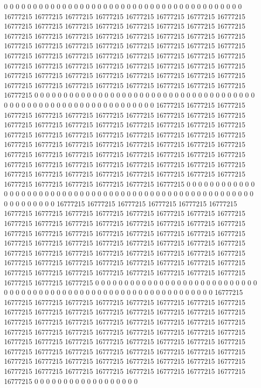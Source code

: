 0 0 0 0 0 0 0 0 0 0 0 0 0 0 0 0 0 0 0 0 0 0 0 0 0 0 0 0 0 0 0 0 0 0 0 0 0 0 0 0 0 16777215 16777215 16777215 16777215 16777215 16777215 16777215 16777215 16777215 16777215 16777215 16777215 16777215 16777215 16777215 16777215 16777215 16777215 16777215 16777215 16777215 16777215 16777215 16777215 16777215 16777215 16777215 16777215 16777215 16777215 16777215 16777215 16777215 16777215 16777215 16777215 16777215 16777215 16777215 16777215 16777215 16777215 16777215 16777215 16777215 16777215 16777215 16777215 16777215 16777215 16777215 16777215 16777215 16777215 16777215 16777215 16777215 16777215 16777215 16777215 16777215 16777215 16777215 16777215 16777215 0 0 0 0 0 0 0 0 0 0 0 0 0 0 0 0 0 0 0 0 0 0
0 0 0 0 0 0 0 0 0 0 0 0 0 0 0 0 0 0 0 0 0 0 0 0 0 0 0 0 0 0 0 0 0 0 0 0 0 0 0 0 0 0 16777215 16777215 16777215 16777215 16777215 16777215 16777215 16777215 16777215 16777215 16777215 16777215 16777215 16777215 16777215 16777215 16777215 16777215 16777215 16777215 16777215 16777215 16777215 16777215 16777215 16777215 16777215 16777215 16777215 16777215 16777215 16777215 16777215 16777215 16777215 16777215 16777215 16777215 16777215 16777215 16777215 16777215 16777215 16777215 16777215 16777215 16777215 16777215 16777215 16777215 16777215 16777215 16777215 16777215 16777215 16777215 16777215 16777215 16777215 16777215 16777215 16777215 16777215 16777215 16777215 0 0 0 0 0 0 0 0 0 0 0 0 0 0 0 0 0 0 0 0 0
0 0 0 0 0 0 0 0 0 0 0 0 0 0 0 0 0 0 0 0 0 0 0 0 0 0 0 0 0 0 0 0 0 0 0 0 0 0 0 0 0 0 0 16777215 16777215 16777215 16777215 16777215 16777215 16777215 16777215 16777215 16777215 16777215 16777215 16777215 16777215 16777215 16777215 16777215 16777215 16777215 16777215 16777215 16777215 16777215 16777215 16777215 16777215 16777215 16777215 16777215 16777215 16777215 16777215 16777215 16777215 16777215 16777215 16777215 16777215 16777215 16777215 16777215 16777215 16777215 16777215 16777215 16777215 16777215 16777215 16777215 16777215 16777215 16777215 16777215 16777215 16777215 16777215 16777215 16777215 16777215 16777215 16777215 16777215 16777215 16777215 16777215 0 0 0 0 0 0 0 0 0 0 0 0 0 0 0 0 0 0 0 0
0 0 0 0 0 0 0 0 0 0 0 0 0 0 0 0 0 0 0 0 0 0 0 0 0 0 0 0 0 0 0 0 0 0 0 0 0 0 0 0 0 0 0 0 16777215 16777215 16777215 16777215 16777215 16777215 16777215 16777215 16777215 16777215 16777215 16777215 16777215 16777215 16777215 16777215 16777215 16777215 16777215 16777215 16777215 16777215 16777215 16777215 16777215 16777215 16777215 16777215 16777215 16777215 16777215 16777215 16777215 16777215 16777215 16777215 16777215 16777215 16777215 16777215 16777215 16777215 16777215 16777215 16777215 16777215 16777215 16777215 16777215 16777215 16777215 16777215 16777215 16777215 16777215 16777215 16777215 16777215 16777215 16777215 16777215 16777215 16777215 16777215 16777215 16777215 0 0 0 0 0 0 0 0 0 0 0 0 0 0 0 0 0 0
